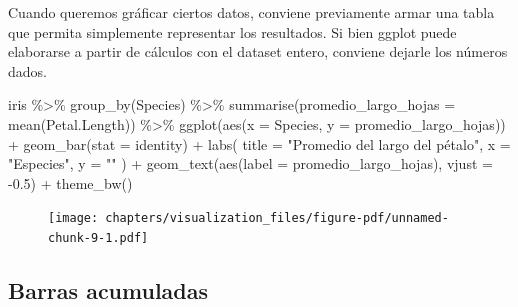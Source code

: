 \documentclass[
  letterpaper,
  DIV=11,
  numbers=noendperiod]{scrreprt}
\newenvironment{Shaded}{\begin{snugshade}}{\end{snugshade}}
\newcommand{\AttributeTok}[1]{\textcolor[rgb]{0.40,0.45,0.13}{#1}}
\newcommand{\FloatTok}[1]{\textcolor[rgb]{0.68,0.00,0.00}{#1}}
\newcommand{\FunctionTok}[1]{\textcolor[rgb]{0.28,0.35,0.67}{#1}}
\newcommand{\NormalTok}[1]{\textcolor[rgb]{0.00,0.23,0.31}{#1}}
\newcommand{\SpecialCharTok}[1]{\textcolor[rgb]{0.37,0.37,0.37}{#1}}
\newcommand{\StringTok}[1]{\textcolor[rgb]{0.13,0.47,0.30}{#1}}
\begin{document}
Cuando queremos gráficar ciertos datos, conviene previamente armar una
tabla que permita simplemente representar los resultados. Si bien ggplot
puede elaborarse a partir de cálculos con el dataset entero, conviene
dejarle los números dados.

\begin{Shaded}
\begin{Highlighting}[]
\NormalTok{iris }\SpecialCharTok{\%\textgreater{}\%} 
  \FunctionTok{group\_by}\NormalTok{(Species) }\SpecialCharTok{\%\textgreater{}\%} 
  \FunctionTok{summarise}\NormalTok{(}\AttributeTok{promedio\_largo\_hojas =} \FunctionTok{mean}\NormalTok{(Petal.Length)) }\SpecialCharTok{\%\textgreater{}\%} 
  \FunctionTok{ggplot}\NormalTok{(}\FunctionTok{aes}\NormalTok{(}\AttributeTok{x =}\NormalTok{ Species, }\AttributeTok{y =}\NormalTok{ promedio\_largo\_hojas)) }\SpecialCharTok{+}
  \FunctionTok{geom\_bar}\NormalTok{(}\AttributeTok{stat =} \StringTok{\textquotesingle{}identity\textquotesingle{}}\NormalTok{) }\SpecialCharTok{+}
    \FunctionTok{labs}\NormalTok{(}
    \AttributeTok{title =} \StringTok{"Promedio del largo del pétalo"}\NormalTok{,}
    \AttributeTok{x =} \StringTok{"Especies"}\NormalTok{,}
    \AttributeTok{y =} \StringTok{""}
\NormalTok{  ) }\SpecialCharTok{+} 
  \FunctionTok{geom\_text}\NormalTok{(}\FunctionTok{aes}\NormalTok{(}\AttributeTok{label =}\NormalTok{ promedio\_largo\_hojas), }\AttributeTok{vjust =} \SpecialCharTok{{-}}\FloatTok{0.5}\NormalTok{) }\SpecialCharTok{+}
  \FunctionTok{theme\_bw}\NormalTok{()}
\end{Highlighting}
\end{Shaded}

\begin{figure}[H]

{\centering \texttt{[image: chapters/visualization\_files/figure-pdf/unnamed-chunk-9-1.pdf]}

}

\end{figure}

\hypertarget{barras-acumuladas}{%
\subsection{Barras acumuladas}\label{barras-acumuladas}}
\end{document}
